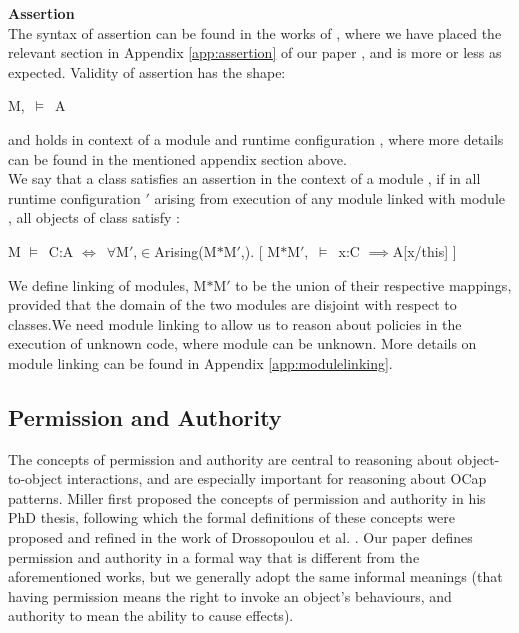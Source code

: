 \documentclass[a4paper,11pt,twoside]{article}
\newenvironment{logic}
{\begin{minipage}[c]{\linewidth}  \sffamily \mdseries \begin{tabbing}}
{\end{tabbing}\end{minipage}\vspace{0.3em}}
\newcommand{\loin}{$\in$}
\newcommand{\loforall}{$\forall$}
\newcommand{\loimplies}{$\implies$}
\newcommand{\losigma}{\text{$\upsigma$}}
\newcommand{\loturns} {$\vDash$}
\newcommand{\loiff} {$\iff$}
\begin{document}
\textbf{Assertion}\\
The syntax of assertion can be found in the works of \cite{drossopoulou2015b}, where we have placed the relevant section in Appendix \cref{app:assertion} of our paper , and is more or less as expected. Validity of assertion has the shape:\\

\begin{logic}
M,\losigma\ \loturns\ A\\
\end{logic}

and holds in context of a module  and runtime configuration \sf{\losigma}, where more details can be found in the mentioned appendix section above.\\

We say that a class  satisfies an assertion  in the context of a module , if in all runtime configuration \losigma$'$ arising from execution of any module  linked with module , all objects of class  satisfy :\\

\begin{logic}
M \loturns\ C:A \loiff\ \loforall M$'$,\losigma\loin Arising(M$*$M$'$,\losigma). [ M$*$M$'$,\losigma\ \loturns\ x:C \loimplies A[x/this] ]\\
\end{logic}

We define linking of modules, M$*$M$'$ to be the union of their respective mappings, provided that the domain of the two modules are disjoint with respect to classes.We need module linking to allow us to reason about policies in the execution of unknown code, where module  can be unknown.  More details on module linking can be found in Appendix \cref{app:modulelinking}.
\subsection{Permission and Authority}\label{sec:permauth}
The concepts of permission and authority are central to reasoning about object-to-object interactions, and are especially important for reasoning about OCap patterns. Miller first proposed the concepts of permission and authority in his PhD thesis\cite{miller2006}, following which the formal definitions of these concepts were proposed and refined in the work of Drossopoulou et al. \cite{drossopoulou2016}. Our paper defines permission and authority in a formal way that is different from the aforementioned works, but we generally adopt the same informal meanings (that having permission means the right to invoke an object's behaviours, and authority to mean the ability to cause effects).
\end{document}

